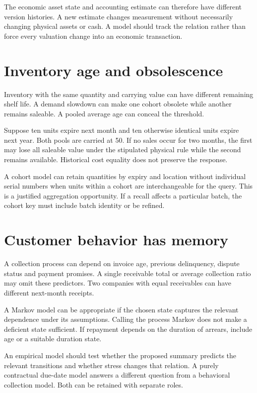 The economic asset state and accounting estimate can therefore have different version histories. A new estimate changes measurement without necessarily changing physical assets or cash. A model should track the relation rather than force every valuation change into an economic transaction.

\section{Inventory age and obsolescence}
Inventory with the same quantity and carrying value can have different remaining shelf life. A demand slowdown can make one cohort obsolete while another remains saleable. A pooled average age can conceal the threshold.

Suppose ten units expire next month and ten otherwise identical units expire next year. Both pools are carried at 50. If no sales occur for two months, the first may lose all saleable value under the stipulated physical rule while the second remains available. Historical cost equality does not preserve the response.

A cohort model can retain quantities by expiry and location without individual serial numbers when units within a cohort are interchangeable for the query. This is a justified aggregation opportunity. If a recall affects a particular batch, the cohort key must include batch identity or be refined.

\section{Customer behavior has memory}
A collection process can depend on invoice age, previous delinquency, dispute status and payment promises. A single receivable total or average collection ratio may omit these predictors. Two companies with equal receivables can have different next-month receipts.

A Markov model can be appropriate if the chosen state captures the relevant dependence under its assumptions. Calling the process Markov does not make a deficient state sufficient. If repayment depends on the duration of arrears, include age or a suitable duration state.

An empirical model should test whether the proposed summary predicts the relevant transitions and whether stress changes that relation. A purely contractual due-date model answers a different question from a behavioral collection model. Both can be retained with separate roles.

